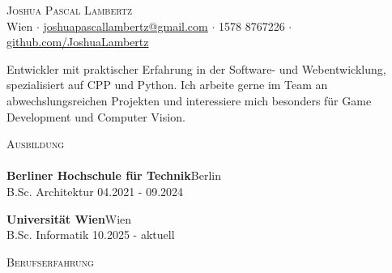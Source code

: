 \documentclass[a4paper]{article}
\newcommand{\lineunder} {
    \vspace*{-8pt} \\
    \hspace*{-18pt} \hrulefill \\
}
\newcommand{\header} [1] {
    {\hspace*{-18pt}\vspace*{6pt} \textsc{#1}}
    \vspace*{-6pt} \lineunder
}
\begin{document}
\vspace*{-40pt}

\vspace*{-10pt}
\begin{center}
	{\Huge \scshape {Joshua Pascal Lambertz}}\\
	Wien $\cdot$ \href{mailto:joshuapascallambertz@gmail.com}{joshuapascallambertz@gmail.com} $\cdot$ 1578 8767226 $\cdot$ \href{https://github.com/BatuhanHerdem}{github.com/JoshuaLambertz}\\
\end{center}

\begin{center}
\begin{minipage}{0.93\textwidth}
\centering
\small
Entwickler mit praktischer Erfahrung in der Software- und Webentwicklung, spezialisiert auf CPP und Python. Ich arbeite gerne im Team an abwechslungsreichen Projekten und interessiere mich besonders für Game Development und Computer Vision.
\end{minipage}
\end{center}

\header{Ausbildung}
\textbf{Berliner Hochschule für Technik}\hfill Berlin\\
B.Sc. Architektur \hfill 04.2021 - 09.2024

\vspace{3mm}
\noindent\textbf{Universität Wien}\hfill Wien\\
B.Sc. Informatik \hfill 10.2025 - aktuell
\vspace{8mm}

\header{Berufserfahrung}
\vspace{1mm}
\end{document}
